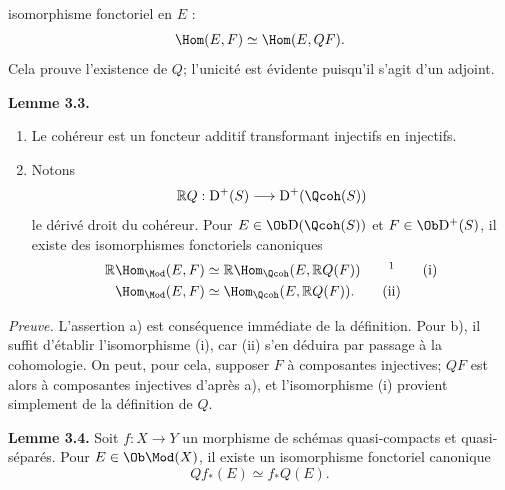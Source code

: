 isomorphisme fonctoriel en $E$ :
\[
 \Hom(E,F)\simeq\Hom(E,QF).
\]
Cela prouve l'existence de $Q$; l'unicité est évidente puisqu'il s'agit d'un adjoint.

\textbf{Lemme 3.3.} \begin{enumerate}[label=\alph*)]
\item Le cohéreur est un foncteur additif transformant injectifs en injectifs.
\item Notons
\[
 \mathbb RQ:\mathrm D^+(S)\longrightarrow \mathrm D^+(\Qcoh(S))
\]
le dérivé droit du cohéreur. Pour $E\in\Ob\mathrm D(\Qcoh(S))$ et $F\in\Ob\mathrm D^+(S)$, il existe des isomorphismes fonctoriels canoniques
\begin{align}
 \mathbb R\Hom_{\Mod}(E,F)&\simeq \mathbb R\Hom_{\Qcoh}(E,\mathbb RQ(F)) \qquad\text{\footnotemark}\tag{i}\\
 \Hom_{\Mod}(E,F)&\simeq \Hom_{\Qcoh}(E,\mathbb RQ(F)). \tag{ii}
\end{align}
\end{enumerate}

\emph{Preuve.} L'assertion a) est conséquence immédiate de la définition. Pour b), il suffit d'établir l'isomorphisme (i), car (ii) s'en déduira par passage à la cohomologie. On peut, pour cela, supposer $F$ à composantes injectives; $QF$ est alors à composantes injectives d'après a), et l'isomorphisme (i) provient simplement de la définition de $Q$.

\textbf{Lemme 3.4.} Soit $f:X\longrightarrow Y$ un morphisme de schémas quasi-compacts et quasi-séparés. Pour $E\in\Ob\Mod(X)$, il existe un isomorphisme fonctoriel canonique
\[
 Qf_*(E)\simeq f_*Q(E).
\]

